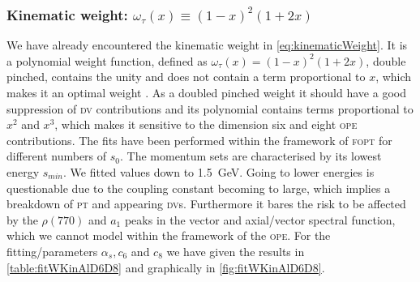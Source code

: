 \documentclass[../../index.tex]{subfiles}
\begin{document}
\subsubsection{Kinematic weight: $\omega_{\tau}(x) \equiv (1-x)^2(1+2x)$}
We have already encountered the kinematic weight in \cref{eq:kinematicWeight}.
It is a polynomial weight function, defined as \(\omega_\tau(x) =
(1-x)^2(1+2x)\), double pinched, contains the unity and does not contain a term
proportional to \(x\), which makes it an optimal weight \cite{Beneke2012}. As a
doubled pinched weight it should have a good suppression of
\textsc{dv} contributions and its polynomial contains terms proportional to
\(x^2\) and \(x^3\), which makes it sensitive to the dimension six and eight
\textsc{ope} contributions. The fits have been performed within the framework of
\textsc{fopt} for different numbers of \(s_0\). The momentum sets are
characterised by its lowest energy \(s_{min}\). We fitted values down to
\SI{1.5}{\giga\eV}. Going to lower energies is questionable due to the coupling
constant becoming to large, which implies a breakdown of \textsc{pt} and
appearing \textsc{dv}s. Furthermore it bares the risk to be affected by the \(\rho(770)\)
and \(a_1\) peaks in the vector and axial\-/vector spectral function, which we
cannot model within the framework of the \textsc{ope}. For the
fitting\-/parameters \(\alpha_s, c_6\) and \(c_8\) we have given the results in
\cref{table:fitWKinAlD6D8} and graphically in \cref{fig:fitWKinAlD6D8}.
\end{document}
